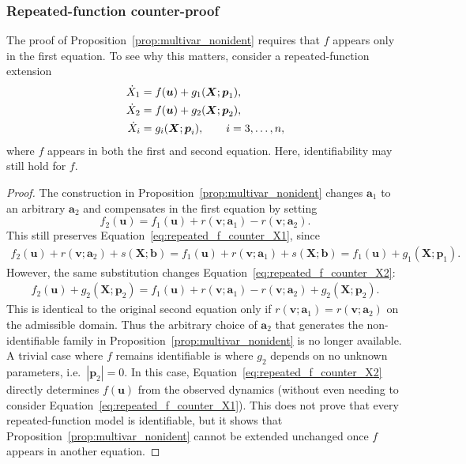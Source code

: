 \documentclass{article}
\theoremstyle{plain}
\theoremstyle{definition}
\renewcommand{\vec}[1]{\boldsymbol{#1}}
\begin{document}
{\subsubsection{Repeated-function counter-proof} \label{appendix:repeated_function_counterexample}

The proof of Proposition~\ref{prop:multivar_nonident} requires that $f$ appears only in the first equation. To see why this matters, consider a repeated-function extension
\begin{align}
    \dot{X}_1 &= f(\vec{u}) + g_1(\vec{X};\vec{p}_1), \label{eq:repeated_f_counter_X1} \\
    \dot{X}_2 &= f(\vec{u}) + g_2(\vec{X};\vec{p}_2), \label{eq:repeated_f_counter_X2} \\
    \dot{X}_i &= g_i(\vec{X};\vec{p}_i), \qquad i=3,\ldots,n, \notag
\end{align}
where $f$ appears in both the first and second equation. Here, identifiability may still hold for $f$.

\begin{proof}
The construction in Proposition~\ref{prop:multivar_nonident} changes $\vec{a}_1$ to an arbitrary $\vec{a}_2$ and compensates in the first equation by setting
\begin{equation*}
    f_2(\vec{u}) = f_1(\vec{u}) + r(\vec{v};\vec{a}_1) - r(\vec{v};\vec{a}_2).
\end{equation*}
This still preserves Equation~\eqref{eq:repeated_f_counter_X1}, since
\begin{align*}
    f_2(\vec{u}) + r(\vec{v};\vec{a}_2) + s(\vec{X};\vec{b})
    = f_1(\vec{u}) + r(\vec{v};\vec{a}_1) + s(\vec{X};\vec{b}) = f_1(\vec{u}) + g_1(\vec{X};\vec{p}_1).
\end{align*}
However, the same substitution changes Equation~\eqref{eq:repeated_f_counter_X2}:
\begin{align*}
    f_2(\vec{u}) + g_2(\vec{X};\vec{p}_2)
    = f_1(\vec{u}) + r(\vec{v};\vec{a}_1) - r(\vec{v};\vec{a}_2) + g_2(\vec{X};\vec{p}_2).
\end{align*}
This is identical to the original second equation only if $r(\vec{v};\vec{a}_1)=r(\vec{v};\vec{a}_2)$ on the admissible domain. Thus the arbitrary choice of $\vec{a}_2$ that generates the non-identifiable family in Proposition~\ref{prop:multivar_nonident} is no longer available. A trivial case where $f$ remains identifiable is where $g_2$ depends on no unknown parameters, i.e.~$|\vec{p}_2| = 0$. In this case, Equation~\eqref{eq:repeated_f_counter_X2} directly determines $f(\vec{u})$ from the observed dynamics (without even needing to consider Equation~\eqref{eq:repeated_f_counter_X1}). This does not prove that every repeated-function model is identifiable, but it shows that Proposition~\ref{prop:multivar_nonident} cannot be extended unchanged once $f$ appears in another equation.
\end{proof}

}
\end{document}
